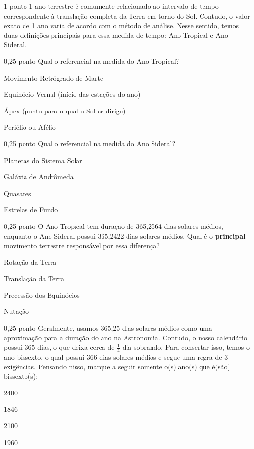 \documentclass{../lista}
\begin{document}
	\begin{questao}{1 ponto}
		1 ano terrestre é comumente relacionado ao intervalo de tempo correspondente à translação completa da Terra em torno do Sol. Contudo, o valor exato de 1 ano varia de acordo com o método de análise. Nesse sentido, temos duas definições principais para essa medida de tempo: Ano Tropical e Ano Sideral.
		\begin{pergunta}{0,25 ponto}
			Qual o referencial na medida do Ano Tropical?
			\begin{alternativas}
				\item Movimento Retrógrado de Marte
				\item Equinócio Vernal (início das estações do ano)
				\item Ápex (ponto para o qual o Sol se dirige)
				\item Periélio ou Afélio
			\end{alternativas}
		\end{pergunta}
		\begin{pergunta}{0,25 ponto}
			Qual o referencial na medida do Ano Sideral?
			\begin{alternativas}
				\item Planetas do Sistema Solar
				\item Galáxia de Andrômeda
				\item Quasares
				\item Estrelas de Fundo
			\end{alternativas}
		\end{pergunta}
		\begin{pergunta}{0,25 ponto}
			O Ano Tropical tem duração de 365,2564 dias solares médios, enquanto o Ano Sideral possui 365,2422 dias solares médios. Qual é o \textbf{principal} movimento terrestre responsável por essa diferença?
			\begin{alternativas}
				\item Rotação da Terra
				\item Translação da Terra
				\item Precessão dos Equinócios
				\item Nutação
			\end{alternativas}
		\end{pergunta}
		\begin{pergunta}{0,25 ponto}
			Geralmente, usamos 365,25 dias solares médios como uma aproximação para a duração do ano na Astronomia. Contudo, o nosso calendário possui 365 dias, o que deixa cerca de $\frac{1}{4}$ dia sobrando. Para consertar isso, temos o ano bissexto, o qual possui 366 dias solares médios e segue uma regra de 3 exigências. Pensando nisso, marque a seguir somente o(s) ano(s) que é(são) bissexto(s):
			\begin{alternativas}
				\item 2400
				\item 1846
				\item 2100
				\item 1960
			\end{alternativas}
		\end{pergunta}
	\end{questao}
\end{document}
